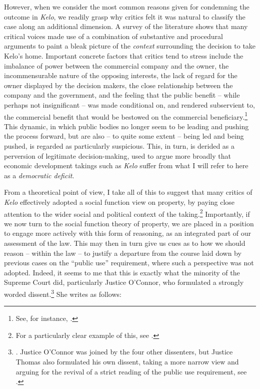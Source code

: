 \documentclass[12pt,a4paper]{book} %
\begin{document}
However, when we consider the most common reasons given for condemning the outcome in {\it Kelo}, we readily grasp why critics felt it was natural to classify the case along an additional dimension. A survey of the literature shows that many critical voices made use of a combination of substantive and procedural arguments to  paint a bleak picture of the {\it context} surrounding the decision to take Kelo's home. Important concrete factors that critics tend to stress include the imbalance of power between the commercial company and the owner, the incommensurable nature of the opposing interests, the lack of regard for the owner displayed by the decision makers, the close relationship between the company and the government, and the feeling that the public benefit -- while perhaps not insignificant -- was made conditional on, and rendered subservient to, the commercial benefit that would be bestowed on the commercial beneficiary.\footnote{See, for instance, \cite{underkuffler06,somin07,sandefur06,cohen06,hafetz09,hudson10}.}  This dynamic, in which public bodies no longer seem to be leading and pushing the process forward, but are also -- to quite some extent -- being led and being pushed, is regarded as particularly suspicious. This, in turn, is derided as a perversion of legitimate decision-making, used to argue more broadly that economic development takings such as {\it Kelo} suffer from what I will refer to here as a {\it democratic deficit}.

From a theoretical point of view, I take all of this to suggest that many critics of {\it Kelo} effectively adopted a social function view on property, by paying close attention to the wider social and political context of the taking.\footnote{For a particularly clear example of this, see \cite{underkuffler06}.} Importantly, if we now turn to the social function theory of property, we are placed in a position to engage more actively with this form of reasoning, as an integrated part of our assessment of the law. This may then in turn give us cues as to how we should reason -- within the law -- to justify a departure from the course laid down by previous cases on the ``public use'' requirement, where such a perspective was not adopted. Indeed, it seems to me that this is exactly what the minority of the Supreme Court did, particularly Justice O'Connor, who formulated a strongly worded dissent.\footnote{\cite[494-505]{kelo05}. Justice O'Connor was joined by the four other dissenters, but Justice Thomas also formulated his own dissent, taking a more narrow view and arguing for the revival of a strict reading of the public use requirement, see \cite[505-523]{kelo05}.} She writes as follows:
\end{document}
